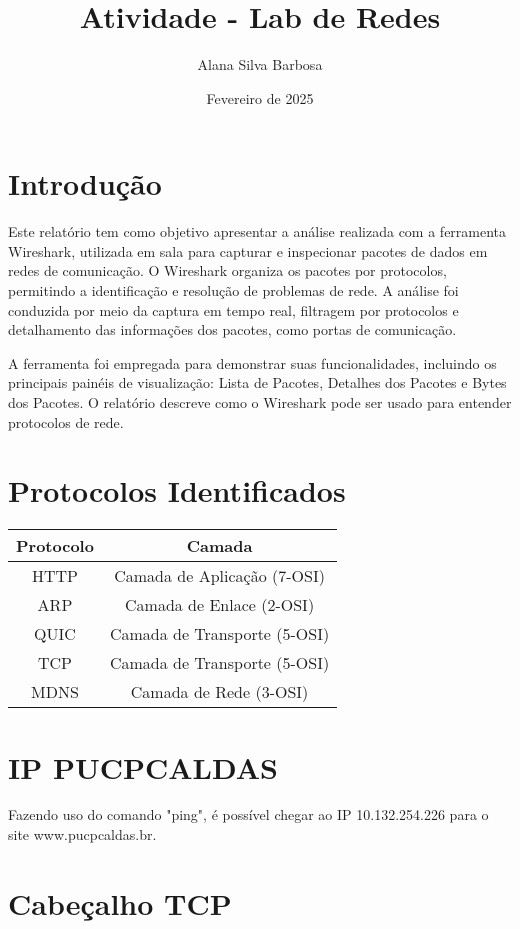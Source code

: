 \documentclass{article} %
\title{Atividade - Lab de Redes}
\author{Alana Silva Barbosa}
\date{Fevereiro de 2025}
\begin{document}
\maketitle  %

\section{Introdução}

Este relatório tem como objetivo apresentar a análise realizada com a ferramenta Wireshark, utilizada em sala para capturar e inspecionar pacotes de dados em redes de comunicação. O Wireshark organiza os pacotes por protocolos, permitindo a identificação e resolução de problemas de rede. A análise foi conduzida por meio da captura em tempo real, filtragem por protocolos e detalhamento das informações dos pacotes, como portas de comunicação.

A ferramenta foi empregada para demonstrar suas funcionalidades, incluindo os principais painéis de visualização: Lista de Pacotes, Detalhes dos Pacotes e Bytes dos Pacotes. O relatório descreve como o Wireshark pode ser usado para  entender protocolos de rede.

\section{Protocolos Identificados}
\begin{tabular}{|c|c|} 
    \hline 
    Protocolo & Camada   \\ \hline 
    HTTP & Camada de Aplicação (7-OSI) \\ \hline
    ARP & Camada de Enlace (2-OSI) \\ \hline
    QUIC & Camada de Transporte (5-OSI) \\ \hline
    TCP & Camada de Transporte (5-OSI) \\ \hline
    MDNS & Camada de Rede (3-OSI) \\ \hline
\end{tabular}

\section{IP PUCPCALDAS}
Fazendo uso do comando "ping", é possível chegar ao IP 10.132.254.226 para o site www.pucpcaldas.br.

\section{Cabeçalho TCP}
\end{document}

